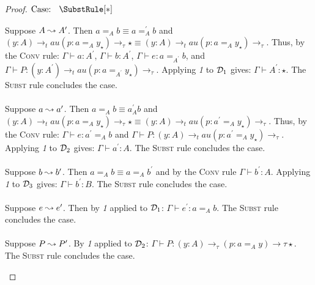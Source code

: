 \begin{proof}
    \begin{minipage}{.8\textwidth}$\text{Case: }\begin{array}{c} \SubstRule[*] \end{array}$\end{minipage}
    \begin{proofcase}
        Suppose $A \leadsto A^\prime$.
        Then $a =_A b \equiv a =_A^\prime b$ and $(y : A) \to_tau (p : a =_A y_\star) \to_\tau \star \equiv (y : A) \to_tau (p : a =_A y_\star) \to_\tau$.
        Thus, by the \textsc{Conv} rule: $\Gamma \vdash a : A^\prime$, $\Gamma \vdash b : A^\prime$, $\Gamma \vdash e : a =_{A^\prime} b$, and $\Gamma \vdash P : (y : A^\prime) \to_tau (p : a =_{A^\prime} y_\star) \to_\tau$.
        Applying \textit{1} to $\mathcal{D}_{1}$ gives: $\Gamma \vdash A^\prime : \star$.
        The \textsc{Subst} rule concludes the case.
        \\ \\
        Suppose $a \leadsto a^\prime$.
        Then $a =_A b \equiv a^\prime _A b$ and $(y : A) \to_tau (p : a =_A y_\star) \to_\tau \star \equiv (y : A) \to_tau (p : a^\prime =_A y_\star) \to_\tau$.
        Thus, by the \textsc{Conv} rule: $\Gamma \vdash e : a^\prime =_A b$ and $\Gamma \vdash P : (y : A) \to_tau (p : a^\prime =_A y_\star) \to_\tau$.
        Applying \textit{1} to $\mathcal{D}_{2}$ gives: $\Gamma \vdash a^\prime : A$.
        The \textsc{Subst} rule concludes the case.
        \\ \\
        Suppose $b \leadsto b^\prime$.
        Then $a =_A b \equiv a =_A b^\prime$ and by the \textsc{Conv} rule $\Gamma \vdash b^\prime : A$.
        Applying \textit{1} to $\mathcal{D}_{3}$ gives: $\Gamma \vdash b^\prime : B$.
        The \textsc{Subst} rule concludes the case.
        \\ \\
        Suppose $e \leadsto e^\prime$.
        Then by \textit{1} applied to $\mathcal{D}_{1}$: $\Gamma \vdash e^\prime : a =_A b$.
        The \textsc{Subst} rule concludes the case.
        \\ \\
        Suppose $P \leadsto P^\prime$.
        By \textit{1} applied to $\mathcal{D}_{2}$: $\Gamma \vdash P : (y : A) \to_\tau (p : a =_A y) \to\tau \star$.
        The \textsc{Subst} rule concludes the case.
    \end{proofcase}


\end{proof}
